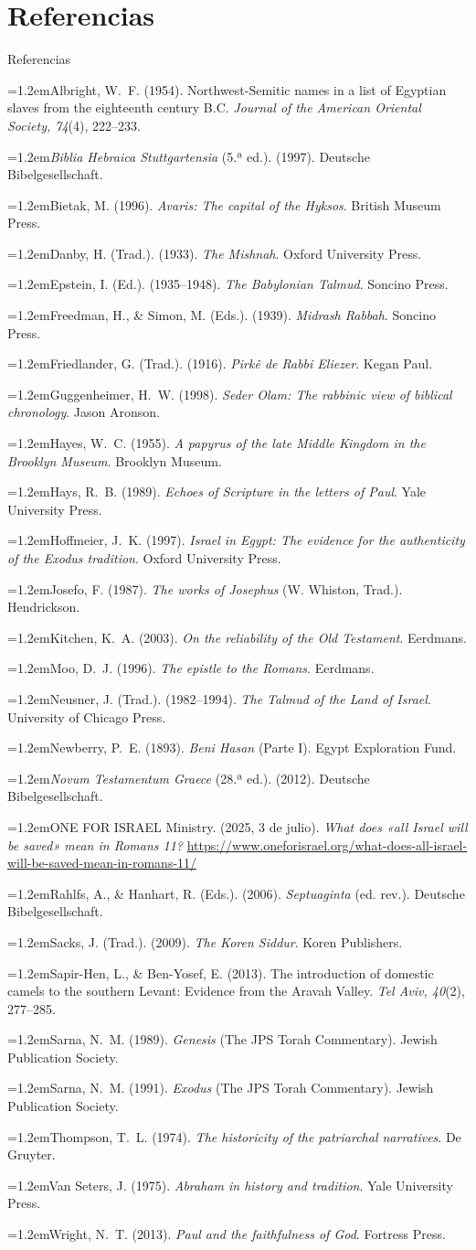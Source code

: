 \documentclass[hyperref={bookmarks=false},aspectratio=169]{beamer}
\newcommand{\refapa}[1]{\par\hangindent=1.2em\hangafter=1\noindent #1\par\vspace{3pt}}
\begin{document}
\section{Referencias}
\begin{frame}[allowframebreaks]{Referencias}
\tiny
\refapa{Albright, W.~F. (1954). Northwest-Semitic names in a list of Egyptian slaves from the eighteenth century B.C. \emph{Journal of the American Oriental Society, 74}(4), 222--233.}
\refapa{\emph{Biblia Hebraica Stuttgartensia} (5.ª ed.). (1997). Deutsche Bibelgesellschaft.}
\refapa{Bietak, M. (1996). \emph{Avaris: The capital of the Hyksos}. British Museum Press.}
\refapa{Danby, H. (Trad.). (1933). \emph{The Mishnah}. Oxford University Press.}
\refapa{Epstein, I. (Ed.). (1935--1948). \emph{The Babylonian Talmud}. Soncino Press.}
\refapa{Freedman, H., \& Simon, M. (Eds.). (1939). \emph{Midrash Rabbah}. Soncino Press.}
\refapa{Friedlander, G. (Trad.). (1916). \emph{Pirkê de Rabbi Eliezer}. Kegan Paul.}
\refapa{Guggenheimer, H.~W. (1998). \emph{Seder Olam: The rabbinic view of biblical chronology}. Jason Aronson.}
\refapa{Hayes, W.~C. (1955). \emph{A papyrus of the late Middle Kingdom in the Brooklyn Museum}. Brooklyn Museum.}
\refapa{Hays, R.~B. (1989). \emph{Echoes of Scripture in the letters of Paul}. Yale University Press.}
\refapa{Hoffmeier, J.~K. (1997). \emph{Israel in Egypt: The evidence for the authenticity of the Exodus tradition}. Oxford University Press.}
\refapa{Josefo, F. (1987). \emph{The works of Josephus} (W. Whiston, Trad.). Hendrickson.}
\refapa{Kitchen, K.~A. (2003). \emph{On the reliability of the Old Testament}. Eerdmans.}
\refapa{Moo, D.~J. (1996). \emph{The epistle to the Romans}. Eerdmans.}
\refapa{Neusner, J. (Trad.). (1982--1994). \emph{The Talmud of the Land of Israel}. University of Chicago Press.}
\refapa{Newberry, P.~E. (1893). \emph{Beni Hasan} (Parte I). Egypt Exploration Fund.}
\refapa{\emph{Novum Testamentum Graece} (28.ª ed.). (2012). Deutsche Bibelgesellschaft.}
\refapa{ONE FOR ISRAEL Ministry. (2025, 3 de julio). \emph{What does «all Israel will be saved» mean in Romans 11?} \url{https://www.oneforisrael.org/what-does-all-israel-will-be-saved-mean-in-romans-11/}}
\refapa{Rahlfs, A., \& Hanhart, R. (Eds.). (2006). \emph{Septuaginta} (ed. rev.). Deutsche Bibelgesellschaft.}
\refapa{Sacks, J. (Trad.). (2009). \emph{The Koren Siddur}. Koren Publishers.}
\refapa{Sapir-Hen, L., \& Ben-Yosef, E. (2013). The introduction of domestic camels to the southern Levant: Evidence from the Aravah Valley. \emph{Tel Aviv, 40}(2), 277--285.}
\refapa{Sarna, N.~M. (1989). \emph{Genesis} (The JPS Torah Commentary). Jewish Publication Society.}
\refapa{Sarna, N.~M. (1991). \emph{Exodus} (The JPS Torah Commentary). Jewish Publication Society.}
\refapa{Thompson, T.~L. (1974). \emph{The historicity of the patriarchal narratives}. De Gruyter.}
\refapa{Van Seters, J. (1975). \emph{Abraham in history and tradition}. Yale University Press.}
\refapa{Wright, N.~T. (2013). \emph{Paul and the faithfulness of God}. Fortress Press.}
\end{frame}
\end{document}
